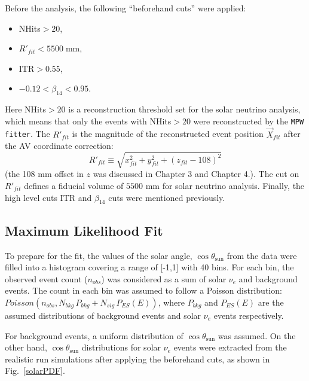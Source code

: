 Before the analysis, the following ``beforehand cuts'' were applied: 
\begin{itemize}
    \item NHits$>20$, 
    \item $R'_{fit}<5500 \; \mathrm{mm}$,
    \item ITR$>0.55$,
    \item $-0.12<\beta_{14}<0.95$. 
\end{itemize}
Here NHits$>20$ is a reconstruction threshold set for the solar neutrino analysis, which means that only the events with NHits$>20$ were reconstructed by the \texttt{MPW fitter}. The $R'_{fit}$ is the magnitude of the reconstructed event position $\vec{X}_{fit}$ after the AV coordinate correction:
\begin{equation*}
R'_{fit}\equiv\sqrt{x^2_{fit}+y^2_{fit}+(z_{fit}-108)^2}
\end{equation*}
(the 108 mm offset in $z$ was discussed in Chapter 3 and Chapter 4.). The cut on $R'_{fit}$ defines a fiducial volume of $5500$ mm for solar neutrino analysis. Finally, the high level cuts ITR and $\beta_{14}$ cuts were mentioned previously.

\subsection{Maximum Likelihood Fit}\label{sect:poisson_fit}

To prepare for the fit, the values of the solar angle, $\cos\theta_\mathrm{sun}$ from the data were filled into a histogram covering a range of [-1,1] with 40 bins. For each bin, the observed event count ($n_{obs}$) was considered as a sum of solar $\nu_e$ and background events. The count in each bin was assumed to follow a Poisson distribution: $Poisson(n_{obs}, N_{bkg} \, P_{bkg}+N_{sig} \, P_{ES}(E))$, where $P_{bkg}$ and $P_{ES}(E)$ are the assumed distributions of background events and solar $\nu_e$ events respectively.

For background events, a uniform distribution of $\cos\theta_\mathrm{sun}$ was assumed. On the other hand, $\cos\theta_\mathrm{sun}$ distributions for solar $\nu_e$ events were extracted from the realistic run simulations after applying the beforehand cuts, as shown in Fig.~\ref{solarPDF}. 

